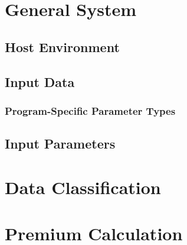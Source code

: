 


\pnumoff\part{General System}\pnumon

\chapter{Host Environment}
  

\chapter{Input Data}
    

    \section{Program-Specific Parameter Types}


\chapter{Input Parameters}
    



\pnumoff\part{Data Classification}\pnumon
  

\pnumoff\part{Premium Calculation}\pnumon
  

